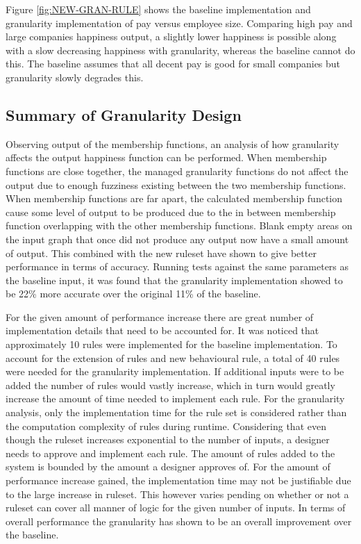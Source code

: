 \documentclass[12pt,fleqn,reqno,letterpaper]{article}
\begin{document}
Figure \ref{fig:NEW-GRAN-RULE} shows the baseline implementation and granularity implementation of pay versus employee size.  Comparing high pay and large companies happiness output, a slightly lower happiness is possible along with a slow decreasing happiness with granularity, whereas the baseline cannot do this.  The baseline assumes that all decent pay is good for small companies but granularity slowly degrades this.

\subsection{Summary of Granularity Design}
Observing output of the membership functions, an analysis of how granularity affects the output happiness function can be performed.  When membership functions are close together, the managed granularity functions do not affect the output due to enough fuzziness existing between the two membership functions.  When membership functions are far apart, the calculated membership function cause some level of output to be produced due to the in between membership function overlapping with the other membership functions.  Blank empty areas on the input graph that once did not produce any output now have a small amount of output.  This combined with the new ruleset have shown to give better performance in terms of accuracy.  Running tests against the same parameters as the baseline input, it was found that the granularity implementation showed to be 22\% more accurate over the original 11\% of the baseline.

For the given amount of performance increase there are great number of implementation details that need to be accounted for.  It was noticed that approximately 10 rules were implemented for the baseline implementation.  To account for the extension of rules and new behavioural rule, a total of 40 rules were needed for the granularity implementation.  If additional inputs were to be added the number of rules would vastly increase, which in turn would greatly increase the amount of time needed to implement each rule.  For the granularity analysis, only the implementation time for the rule set is considered rather than the computation complexity of rules during runtime.  Considering that even though the ruleset increases exponential to the number of inputs, a designer needs to approve and implement each rule.  The amount of rules added to the system is bounded by the amount a designer approves of.  For the amount of performance increase gained, the implementation time may not be justifiable due to the large increase in ruleset.  This however varies pending on whether or not a ruleset can cover all manner of logic for the given number of inputs.  In terms of overall performance the granularity has shown to be an overall improvement over the baseline.
\end{document}
